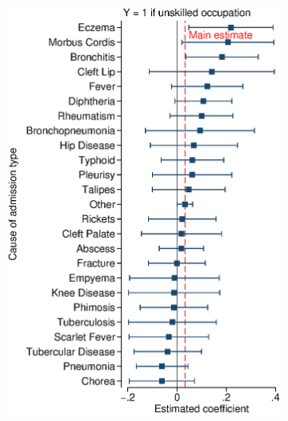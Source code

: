 \documentclass[12pt,english]{article}
\begin{document}
\begin{figure}[!ht]
\begin{subfigure}{0.325\textwidth}
	\includegraphics[width=1.00\linewidth]{../output/02_appendix/figure_a09_panel_5.eps}
\end{subfigure}
\begin{subfigure}{0.325\textwidth}
	\centering

\end{subfigure}
\end{figure}
\end{document}
